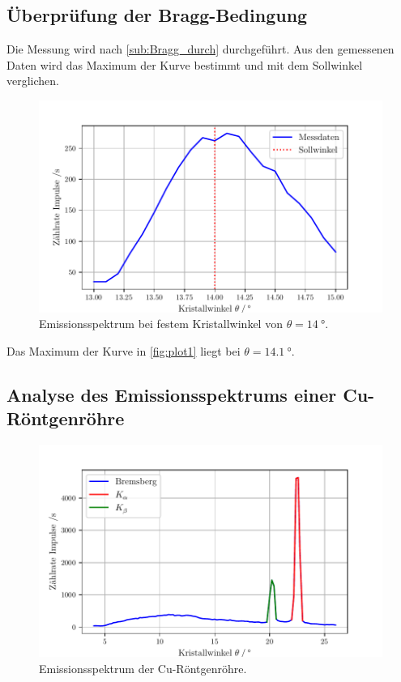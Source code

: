 \subsection{Überprüfung der Bragg-Bedingung} %
\label{sub:Bragg_aus}
Die Messung wird nach \autoref{sub:Bragg_durch} durchgeführt.
Aus den gemessenen Daten wird das Maximum der Kurve bestimmt und mit dem Sollwinkel verglichen.
\begin{figure}[H]
  \centering
  \includegraphics[width=\textwidth]{build/plot1.pdf}
  \caption{Emissionsspektrum bei festem Kristallwinkel von $\theta = \qty{14}{\degree}$.}
  \label{fig:plot1}
\end{figure}

Das Maximum der Kurve in \autoref{fig:plot1} liegt bei $\theta=\qty{14.1}{\degree}$.


\subsection{Analyse des Emissionsspektrums einer Cu-Röntgenröhre} %
\label{sub:Emission_aus}

\begin{figure}[H]
  \centering
  \includegraphics[width=\textwidth]{build/plot2.pdf}
  \caption{Emissionsspektrum der Cu-Röntgenröhre.}
  \label{fig:plot2}
\end{figure}


